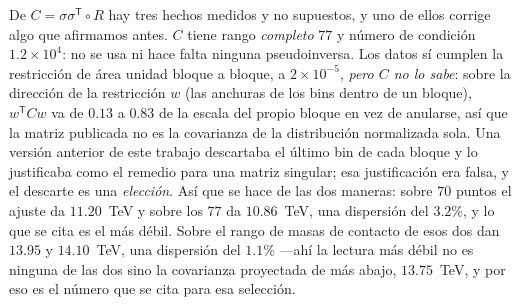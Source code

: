 \documentclass[11pt,a4paper]{article}
\begin{document}
\noindent De $C=\sigma\sigma^{\mathsf T}\!\circ R$ hay tres hechos medidos y no supuestos, y uno de
ellos corrige algo que afirmamos antes. $C$ tiene rango \emph{completo} $77$ y número de condición
$1.2\times10^4$: no se usa ni hace falta ninguna pseudoinversa. Los datos sí cumplen la restricción
de área unidad bloque a bloque, a $2\times10^{-5}$, \emph{pero $C$ no lo sabe}: sobre la dirección
de la restricción $w$ (las anchuras de los bins dentro de un bloque), $w^{\mathsf T}Cw$ va de
$0.13$ a $0.83$ de la escala del propio bloque en vez de anularse, así que la matriz publicada no
es la covarianza de la distribución normalizada sola. Una versión anterior de este trabajo
descartaba el último bin de cada bloque y lo justificaba como el remedio para una matriz singular;
esa justificación era falsa, y el descarte es una \emph{elección}. Así que se hace de las dos
maneras: sobre $70$ puntos el ajuste da $11.20$~TeV y sobre los $77$ da $10.86$~TeV, una
dispersión del $3.2\%$, y lo que se cita es el más débil. Sobre el rango de masas de contacto de
\cite{CMSangular} esos dos dan $13.95$ y $14.10$~TeV, una dispersión del $1.1\%$ ---ahí la lectura
más débil no es ninguna de las dos sino la covarianza proyectada de más abajo, $13.75$~TeV, y por
eso es el número que se cita para esa selección.
\end{document}
